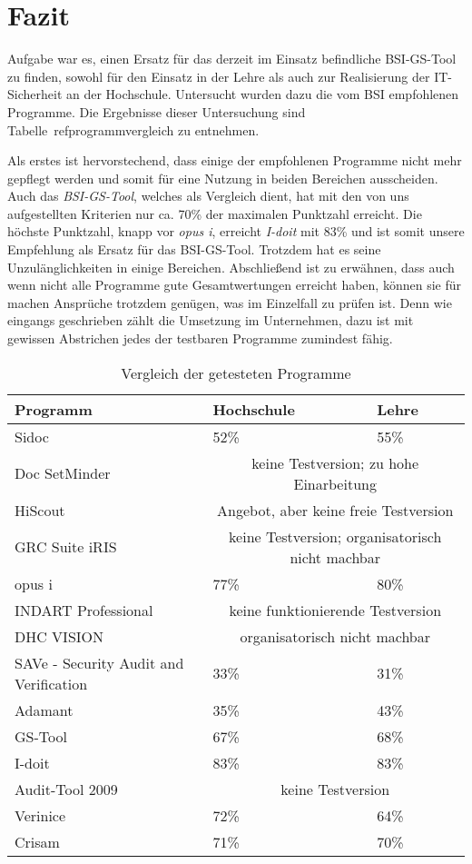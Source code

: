 \section{Fazit}
Aufgabe war es, einen Ersatz für das derzeit im Einsatz befindliche BSI-GS-Tool zu finden, sowohl für den Einsatz in der Lehre als auch zur Realisierung der IT-Sicherheit an der Hochschule. Untersucht wurden dazu die vom BSI empfohlenen Programme. Die Ergebnisse dieser Untersuchung sind Tabelle~ref{programmvergleich} zu entnehmen.

Als erstes ist hervorstechend, dass einige der empfohlenen Programme nicht mehr gepflegt werden und somit für eine Nutzung in beiden Bereichen ausscheiden. Auch das \textit{BSI-GS-Tool}, welches als Vergleich dient, hat mit den von uns aufgestellten Kriterien nur ca. 70\% der maximalen Punktzahl erreicht. Die höchste Punktzahl, knapp vor \textit{opus i}, erreicht \textit{I-doit} mit 83\% und ist somit unsere Empfehlung als Ersatz für das BSI-GS-Tool. Trotzdem hat es seine Unzulänglichkeiten in einige Bereichen. Abschließend ist zu erwähnen, dass auch wenn nicht alle Programme gute Gesamtwertungen erreicht haben, können sie für machen Ansprüche trotzdem genügen, was im Einzelfall zu prüfen ist. Denn wie eingangs geschrieben zählt die Umsetzung im Unternehmen, dazu ist mit gewissen Abstrichen jedes der testbaren Programme zumindest fähig.
\begin{table}[h!tb]
	\begin{tabular}{|p{}|p{}|p{}|}
		\hline 
		\textbf{Programm} & \textbf{Hochschule} & \textbf{Lehre}\\ 
		\hline
		Sidoc & 52\% & 55\% \\
		\hline 
		Doc SetMinder & \multicolumn{2}{c|}{keine Testversion; zu hohe Einarbeitung}\\
		\hline 
		HiScout & \multicolumn{2}{c|}{Angebot, aber keine freie Testversion} \\
		\hline 
		GRC Suite iRIS & \multicolumn{2}{c|}{keine Testversion; organisatorisch nicht machbar}\\
		\hline 
		opus i & 77\% & 80\% \\
		\hline
		INDART Professional & \multicolumn{2}{c|}{keine funktionierende Testversion} \\
		\hline 
		DHC VISION & \multicolumn{2}{c|}{organisatorisch nicht machbar} \\
		\hline 
		SAVe - Security Audit and Verification & 33\% & 31\% \\
		\hline 
		Adamant & 35\% & 43\%\\
		\hline 
		GS-Tool & 67\% & 68\% \\
		\hline  
		I-doit & 83\% & 83\% \\
		\hline
		Audit-Tool 2009 & \multicolumn{2}{c|}{keine Testversion} \\
		\hline
		Verinice & 72\% & 64\% \\
		\hline
		Crisam & 71\% & 70\% \\
		\hline
	\end{tabular} 
	\caption{Vergleich der getesteten Programme}
	\label{tab:programmvergleich}
\end{table}
